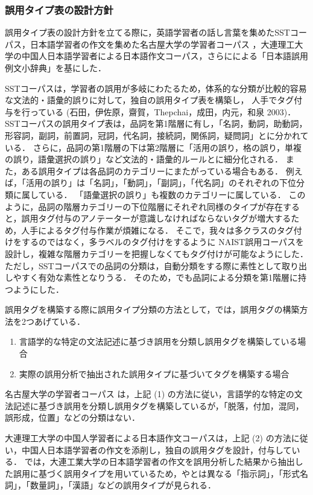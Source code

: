\documentclass[japanese]{jnlp_1.4}
\newcommand{\ngc}{}
\begin{document}
\subsubsection{誤用タイプ表の設計方針}

誤用タイプ表の設計方針を立てる際に，英語学習者の話し言葉を集めたSSTコーパス，日本語学習者の作文を集めた名古屋大学の学習者コーパス \cite{oso/97}，大連理工大学の中国人日本語学習者による日本語作文コーパス\cite{shimizu/2004}，さらにによる「日本語誤用例文小辞典」を基にした．

SSTコーパスは，学習者の誤用が多岐にわたるため，体系的な分類が比較的容易な文法的・語彙的誤りに対して，独自の誤用タイプ表を構築し，
    人手でタグ付与を行っている (石田，伊佐原，齋賀，Thepchai，成田，内元，和泉 2003)\nocite{ishidaj/03}．
SSTコーパスの誤用タイプ表は，品詞を第1階層に有し，「名詞，動詞，助動詞，形容詞，副詞，前置詞，冠詞，代名詞，接続詞，関係詞，疑問詞」とに分かれている．
さらに，品詞の第1階層の下は第2階層に「活用の誤り，格の誤り，単複の誤り，語彙選択の誤り」など文法的・語彙的ルールとに細分化される．
また，ある誤用タイプは各品詞のカテゴリーにまたがっている場合もある．
例えば，「活用の誤り」は「名詞」，「動詞」，「副詞」，「代名詞」のそれぞれの下位分類に属している．
「語彙選択の誤り」も複数のカテゴリーに属している．
このように，品詞の階層カテゴリーの下位階層にそれぞれ同様のタイプが存在すると，誤用タグ付与のアノテーターが意識しなければならないタグが増大するため，人手によるタグ付与作業が煩雑になる．
そこで，我々は多クラスのタグ付けをするのではなく，多ラベルのタグ付けをするように NAIST誤用コーパスを設計し，複雑な階層カテゴリーを把握しなくてもタグ付けが可能なようにした．
ただし，SSTコーパスでの品詞の分類は，自動分類をする際に素性として取り出しやすく有効な素性となりうる．
そのため，\ngc\hbox{}でも品詞による分類を第1階層に持つようにした．


誤用タグを構築する際に誤用タイプ分類の方法として，では，誤用タグの構築方法を2つあげている．
\begin{enumerate}
\item 言語学的な特定の文法記述に基づき誤用を分類し誤用タグを構築している場合
\item 実際の誤用分析で抽出された誤用タイプに基づいてタグを構築する場合
\end{enumerate}
名古屋大学の学習者コーパス は，上記 (1) の方法に従い，言語学的な特定の文法記述に基づき誤用を分類し誤用タグを構築しているが，「脱落，付加，混同，誤形成，位置」などの分類はない．

大連理工大学の中国人学習者による日本語作文コーパスは，上記 (2) の方法に従い，中国人日本語学習者の作文を添削し，独自の誤用タグを設計，付与している．
では，大連工業大学の日本語学習者の作文を誤用分析した結果から抽出した誤用に基づく誤用タイプを用いているため，やとは異なる「指示詞」，「形式名詞」，「数量詞」，「漢語」などの誤用タイプが見られる．
\end{document}
